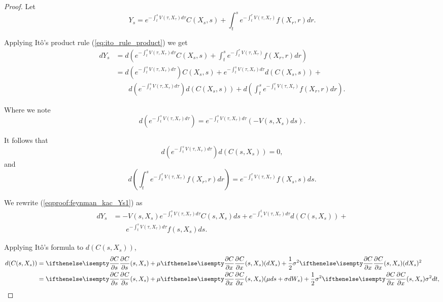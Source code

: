 \documentclass[../TGMAFFIRO.tex]{subfiles}
\begin{document}
\begin{proof}
Let
\begin{equation}
	Y_s = e^{-\int_t^s V(\tau, X_\tau) d\tau}C(X_s, s) + \int_t^s e^{-\int_t^rV(\tau, X_\tau)}f(X_r, r) dr.
\end{equation}

Applying It\^o's product rule (\ref{eq:ito_rule_product}) we get
\begin{align}
	dY_s &= d\left(e^{-\int_t^s V(\tau, X_\tau) d\tau}C(X_s, s) + \int_t^s e^{-\int_t^rV(\tau, X_\tau)}f(X_r, r) dr\right) \nonumber \\
	&= d\left(e^{-\int_t^s V(\tau, X_\tau) d\tau}\right)C(X_s, s) + e^{-\int_t^s V(\tau, X_\tau) d\tau}d\left(C(X_s, s)\right) + \nonumber \\
	&\phantom{{}=1} d\left(e^{-\int_t^s V(\tau, X_\tau) d\tau}\right)d\left(C(X_s, s)\right) + d\left(\int_t^s e^{-\int_t^rV(\tau, X_\tau)}f(X_r, r) dr\right) \label{eqproof:feynman_kac_Ys1}.
\end{align}

Where we note
\begin{equation}
  d\left(e^{-\int_t^s V(\tau, X_\tau) d\tau}\right) = e^{-\int_t^s V(\tau, X_\tau) d\tau}\left(-V(s, X_s) ds\right).
\end{equation}

It follows that 
\begin{equation}
    d\left(e^{-\int_t^s V(\tau, X_\tau) d\tau}\right)d\left(C(s, X_s)\right) = 0, 
\end{equation}
and
\begin{equation}
  d\left(\int_t^s e^{-\int_t^rV(\tau, X_\tau)}f(X_r, r) dr\right) = e^{-\int_t^rV(\tau, X_\tau)}f(X_s, s) ds.
\end{equation}

We rewrite (\ref{eqproof:feynman_kac_Ys1}) as
\begin{align}
  dY_s &= -V(s, X_s)e^{-\int_t^s V(\tau, X_\tau) d\tau}C(s, X_s) ds + e^{-\int_s^t V(\tau, X_\tau)d\tau}d(C(s, X_s))\nonumber +\\
   &\phantom{{}=1}e^{-\int_t^s V(\tau, X_\tau)d\tau}f(s, X_s) ds\label{eqproof:feynman_kac_Ys2}.
\end{align}

Applying It\^o's formula to $d(C(s, X_s))$,
\begin{align}
  d(C(s, X_s)) &= \partialwrt{C}{s}{(s, X_s)} + \mu\partialwrt{C}{x}{(s, X_s)}(dX_s) + \frac{1}{2}\sigma^2\partialwrt{C}{x}{(s, X_s)} (dX_s) ^ 2\nonumber\\
  	&= \partialwrt{C}{s}{(s, X_s)} + \mu\partialwrt{C}{x}{(s, X_s)}(\mu ds + \sigma dW_s) + \frac{1}{2}\sigma^2\partialwrt{C}{x}{(s, X_s)} \sigma^2 dt,
\end{align}


\end{proof}
\end{document}

